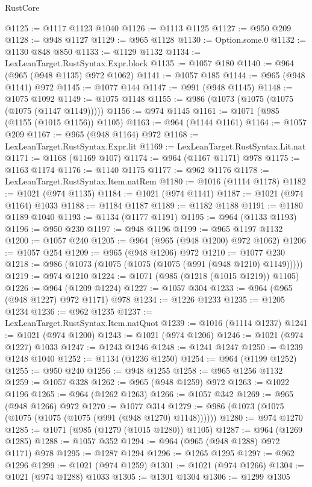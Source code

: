 \begin{lexlean}{RustCore}
\begin{coremodule}
@1125 := @1117 @1123 @1040
@1126 := @1113 @1125
@1127 := @950 @209
@1128 := @948 @1127
@1129 := @965 @1128
@1130 := Option.some.{0}
@1132 := @1130 @848 @850
@1133 := @1129 @1132
@1134 := LexLeanTarget.RustSyntax.Expr.block
@1135 := @1057 @180
@1140 := @964 (@965 (@948 @1135) @972 @1062)
@1141 := @1057 @185
@1144 := @965 (@948 @1141) @972
@1145 := @1077 @144
@1147 := @991 (@948 @1145)
@1148 := @1075 @1092
@1149 := @1075 @1148
@1155 := @986 (@1073 (@1075 (@1075 (@1075 (@1147 @1149)))))
@1156 := @974 @1145
@1161 := @1071 (@985 (@1155 (@1015 @1156)) @1105)
@1163 := @964 (@1144 @1161)
@1164 := @1057 @209
@1167 := @965 (@948 @1164) @972
@1168 := LexLeanTarget.RustSyntax.Expr.lit
@1169 := LexLeanTarget.RustSyntax.Lit.nat
@1171 := @1168 (@1169 @107)
@1174 := @964 (@1167 @1171) @978
@1175 := @1163 @1174
@1176 := @1140 @1175
@1177 := @962 @1176
@1178 := LexLeanTarget.RustSyntax.Item.natRem
@1180 := @1016 (@1114 @1178)
@1182 := @1021 (@974 @1135)
@1184 := @1021 (@974 @1141)
@1187 := @1021 (@974 @1164) @1033
@1188 := @1184 @1187
@1189 := @1182 @1188
@1191 := @1180 @1189 @1040
@1193 := @1134 (@1177 @1191)
@1195 := @964 (@1133 @1193)
@1196 := @950 @230
@1197 := @948 @1196
@1199 := @965 @1197 @1132
@1200 := @1057 @240
@1205 := @964 (@965 (@948 @1200) @972 @1062)
@1206 := @1057 @254
@1209 := @965 (@948 @1206) @972
@1210 := @1077 @230
@1218 := @986 (@1073 (@1075 (@1075 (@1075 (@991 (@948 @1210) @1149)))))
@1219 := @974 @1210
@1224 := @1071 (@985 (@1218 (@1015 @1219)) @1105)
@1226 := @964 (@1209 @1224)
@1227 := @1057 @304
@1233 := @964 (@965 (@948 @1227) @972 @1171) @978
@1234 := @1226 @1233
@1235 := @1205 @1234
@1236 := @962 @1235
@1237 := LexLeanTarget.RustSyntax.Item.natQuot
@1239 := @1016 (@1114 @1237)
@1241 := @1021 (@974 @1200)
@1243 := @1021 (@974 @1206)
@1246 := @1021 (@974 @1227) @1033
@1247 := @1243 @1246
@1248 := @1241 @1247
@1250 := @1239 @1248 @1040
@1252 := @1134 (@1236 @1250)
@1254 := @964 (@1199 @1252)
@1255 := @950 @240
@1256 := @948 @1255
@1258 := @965 @1256 @1132
@1259 := @1057 @328
@1262 := @965 (@948 @1259) @972
@1263 := @1022 @1196
@1265 := @964 (@1262 @1263)
@1266 := @1057 @342
@1269 := @965 (@948 @1266) @972
@1270 := @1077 @314
@1279 := @986 (@1073 (@1075 (@1075 (@1075 (@1075 (@991 (@948 @1270) @1148))))))
@1280 := @974 @1270
@1285 := @1071 (@985 (@1279 (@1015 @1280)) @1105)
@1287 := @964 (@1269 @1285)
@1288 := @1057 @352
@1294 := @964 (@965 (@948 @1288) @972 @1171) @978
@1295 := @1287 @1294
@1296 := @1265 @1295
@1297 := @962 @1296
@1299 := @1021 (@974 @1259)
@1301 := @1021 (@974 @1266)
@1304 := @1021 (@974 @1288) @1033
@1305 := @1301 @1304
@1306 := @1299 @1305

\end{coremodule}
\end{lexlean}
